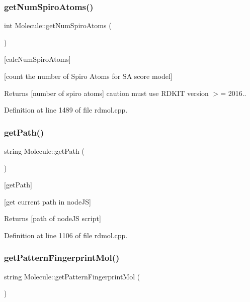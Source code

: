 \subsubsection{\texorpdfstring{get\+Num\+Spiro\+Atoms()}{getNumSpiroAtoms()}}
{\footnotesize\ttfamily int Molecule\+::get\+Num\+Spiro\+Atoms (\begin{DoxyParamCaption}{ }\end{DoxyParamCaption})}



\mbox{[}calc\+Num\+Spiro\+Atoms\mbox{]} 

\mbox{[}count the number of Spiro Atoms for SA score model\mbox{]} \begin{DoxyReturn}{Returns}
\mbox{[}number of spiro atoms\mbox{]} caution must use R\+D\+K\+IT version $>$= 2016.. 
\end{DoxyReturn}


Definition at line 1489 of file rdmol.\+cpp.

\mbox{\label{class_molecule_a5d97408c9357663ceb2b2bff4471c602}} 
\subsubsection{\texorpdfstring{get\+Path()}{getPath()}}
{\footnotesize\ttfamily string Molecule\+::get\+Path (\begin{DoxyParamCaption}{ }\end{DoxyParamCaption})}



\mbox{[}get\+Path\mbox{]} 

\mbox{[}get current path in node\+JS\mbox{]} \begin{DoxyReturn}{Returns}
\mbox{[}path of node\+JS script\mbox{]} 
\end{DoxyReturn}


Definition at line 1106 of file rdmol.\+cpp.

\mbox{\label{class_molecule_a8d537ddf4c7fe5103a3a8f3025f1cea0}} 
\subsubsection{\texorpdfstring{get\+Pattern\+Fingerprint\+Mol()}{getPatternFingerprintMol()}}
{\footnotesize\ttfamily string Molecule\+::get\+Pattern\+Fingerprint\+Mol (\begin{DoxyParamCaption}{ }\end{DoxyParamCaption})}



